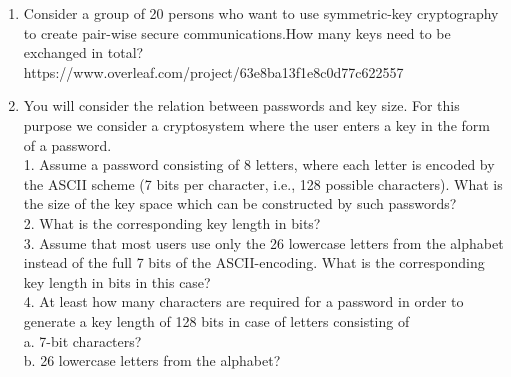 \documentclass[12pt,oneside,oldfontcommands]{memoir}
\begin{document}
  \begin{enumerate}[label=(\alph*)]
    \item Consider a group of 20 persons who want to use symmetric-key cryptography to create pair-wise secure communications.How many keys need to be exchanged in total?https://www.overleaf.com/project/63e8ba13f1e8c0d77c622557
    \item You will consider the relation between passwords and key size. For this purpose
    we consider a cryptosystem where the user enters a key in the form of a password.\\
    1. Assume a password consisting of 8 letters, where each letter is encoded by the
    ASCII scheme (7 bits per character, i.e., 128 possible characters). What is the
    size of the key space which can be constructed by such passwords?\\
    2. What is the corresponding key length in bits?\\
    3. Assume that most users use only the 26 lowercase letters from the alphabet instead of the full 7 bits of the ASCII-encoding. What is the corresponding key length in bits in this case?\\
    4. At least how many characters are required for a password in order to generate a
    key length of 128 bits in case of letters consisting of\\
    a. 7-bit characters?\\
    b. 26 lowercase letters from the alphabet?
  \end{enumerate}

\end{document}
